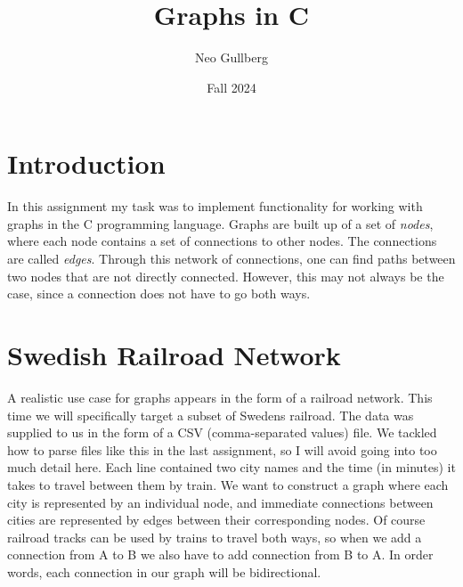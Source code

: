 \documentclass[a4paper, 11pt]{article}
\begin{document}
\title{
	\textbf{Graphs in C}
}
\author{Neo Gullberg}
\date{Fall 2024}
\maketitle

\section{Introduction}
	In this assignment my task was to implement functionality for working with graphs in the C programming language.
	Graphs are built up of a set of \textit{nodes}, where each node contains a set of connections to other nodes.
	The connections are called \textit{edges}.
	Through this network of connections, one can find paths between two nodes that are not directly connected.
	However, this may not always be the case, since a connection does not have to go both ways.

\section{Swedish Railroad Network}
	A realistic use case for graphs appears in the form of a railroad network.
	This time we will specifically target a subset of Swedens railroad.
	The data was supplied to us in the form of a CSV (comma-separated values) file.
	We tackled how to parse files like this in the last assignment, so I will avoid going into too much detail here.
	Each line contained two city names and the time (in minutes) it takes to travel between them by train.
	We want to construct a graph where each city is represented by an individual node,
	and immediate connections between cities are represented by edges between their corresponding nodes.
	Of course railroad tracks can be used by trains to travel both ways,
	so when we add a connection from A to B we also have to add connection from B to A.
	In order words, each connection in our graph will be bidirectional.
\end{document}

